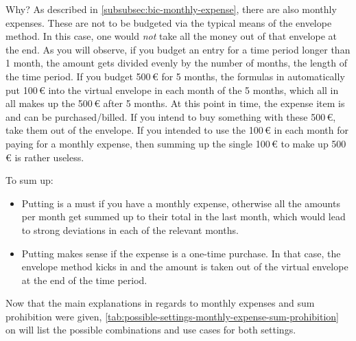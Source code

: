 Why?
As described in \autoref{subsubsec:bic-monthly-expense}, there are also monthly expenses.
These are not to be budgeted via the typical means of the envelope method.
In this case, one would \emph{not} take all the money out of that envelope at the end.
As you will observe, if you budget an entry for a time period longer than 1 month, the amount gets divided evenly by the number of months, \ie the length of the time period.
If you budget 500\,€ for 5 months, the formulas in \tfn automatically put 100\,€ into the virtual envelope in each month of the 5 months, which all in all makes up the 500\,€ after 5 months.
At this point in time, the expense item is  and can be purchased/billed.
If you intend to buy something with these 500\,€, take them out of the envelope.
If you intended to use the 100\,€ in each month for paying for a monthly expense, then summing up the single 100\,€ to make up 500\,€ is rather useless.

To sum up:
\begin{itemize}
	\item Putting  is a must if you have a monthly expense, otherwise all the amounts per month get summed up to their total in the last month, which would lead to strong deviations in each of the relevant months.
	\item Putting  makes sense if the expense is a one-time purchase.
	In that case, the envelope method kicks in and the amount is taken out of the virtual envelope at the end of the time period.
\end{itemize}

Now that the main explanations in regards to monthly expenses and sum prohibition were given, \autoref{tab:possible-settings-monthly-expense-sum-prohibition} on  will list the possible combinations and use cases for both settings.

